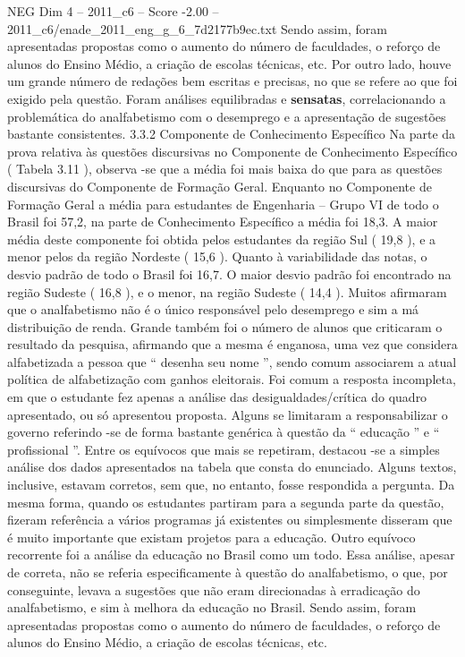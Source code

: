 \begin{textsample}{NEG Dim 4 – 2011\_c6 – Score -2.00 – 2011\_c6/enade\_2011\_eng\_g\_6\_7d2177b9ec.txt}
Sendo assim, foram apresentadas propostas como o aumento do número de faculdades, o reforço de alunos do Ensino Médio, a criação de escolas técnicas, etc.
Por outro lado, houve um grande número de redações bem escritas e precisas, no que se refere ao que foi exigido pela questão.
Foram análises equilibradas e \textbf{sensatas}, correlacionando a problemática do analfabetismo com o desemprego e a apresentação de sugestões bastante consistentes. 3.3.2 Componente de Conhecimento Específico Na parte da prova relativa às questões discursivas no Componente de Conhecimento Específico ( Tabela 3.11 ), observa -se que a média foi mais baixa do que para as questões discursivas do Componente de Formação Geral.
Enquanto no Componente de Formação Geral a média para estudantes de Engenharia – Grupo VI de todo o Brasil foi 57,2, na parte de Conhecimento Específico a média foi 18,3.
A maior média deste componente foi obtida pelos estudantes da região Sul ( 19,8 ), e a menor pelos da região Nordeste ( 15,6 ).
Quanto à variabilidade das notas, o desvio padrão de todo o Brasil foi 16,7.
O maior desvio padrão foi encontrado na região Sudeste ( 16,8 ), e o menor, na região Sudeste ( 14,4 ).
Muitos afirmaram que o analfabetismo não é o único responsável pelo desemprego e sim a má distribuição de renda.
Grande também foi o número de alunos que criticaram o resultado da pesquisa, afirmando que a mesma é enganosa, uma vez que considera alfabetizada a pessoa que “ desenha seu nome ”, sendo comum associarem a atual política de alfabetização com ganhos eleitorais.
Foi comum a resposta incompleta, em que o estudante fez apenas a análise das desigualdades/crítica do quadro apresentado, ou só apresentou proposta.
Alguns se limitaram a responsabilizar o governo referindo -se de forma bastante genérica à questão da “ educação ” e “ profissional ”.
Entre os equívocos que mais se repetiram, destacou -se a simples análise dos dados apresentados na tabela que consta do enunciado.
Alguns textos, inclusive, estavam corretos, sem que, no entanto, fosse respondida a pergunta.
Da mesma forma, quando os estudantes partiram para a segunda parte da questão, fizeram referência a vários programas já existentes ou simplesmente disseram que é muito importante que existam projetos para a educação.
Outro equívoco recorrente foi a análise da educação no Brasil como um todo.
Essa análise, apesar de correta, não se referia especificamente à questão do analfabetismo, o que, por conseguinte, levava a sugestões que não eram direcionadas à erradicação do analfabetismo, e sim à melhora da educação no Brasil.
Sendo assim, foram apresentadas propostas como o aumento do número de faculdades, o reforço de alunos do Ensino Médio, a criação de escolas técnicas, etc.

\end{textsample}
